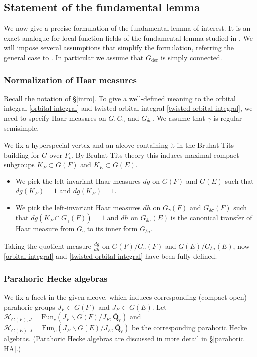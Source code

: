 \documentclass[reqno]{amsart}
\numberwithin{equation}{section}
\newcommand{\Q}{\mathbf{Q}}
\newcommand{\ol}[1]{\overline{#1}}
\newcommand{\Cal}[1]{\mathcal{#1}}
\newcommand{\mrm}[1]{\mathrm{#1}}
\theoremstyle{remark}
\numberwithin{equation}{section}
\begin{document}
\subsection{Statement of the fundamental lemma}\label{FL statement}

We now give a precise formulation of the fundamental lemma of interest. It is an exact analogue for local function fields of the fundamental lemma studied in \cite{Haines09}. We will impose several assumptions that simplify the formulation, referring the general case to \cite{Haines09}. In particular we assume that $G_{\mrm{der}}$ is simply connected.

\subsubsection{Normalization of Haar measures}\label{sssec: Haar measures}
 Recall the notation of \S \ref{intro}. To give a well-defined meaning to the orbital integral \eqref{orbital integral} and twisted orbital integral \eqref{twisted orbital integral}, we need to specify Haar measures on  $G, G_{\gamma}$ and $G_{\delta \sigma}$. We assume that $\gamma$ is regular semisimple. 



We fix a hyperspecial vertex and an alcove containing it in the Bruhat-Tits building for $G$ over $F_t$. By Bruhat-Tits theory this induces maximal compact subgroups $K_F \subset  G(F)$ and $K_E \subset G(E)$. 

\begin{itemize}
\item We pick the left-invariant Haar measures $dg$ on $G(F)$ and $G(E)$ such that $dg(K_F)  =1$ and $dg(K_E)  =1$. 
\item We pick the left-invariant Haar measures $dh$ on $G_{\gamma}(F)$ and $G_{\delta \sigma}(F)$ such that $dg(K_F \cap G_{\gamma}(F) ) = 1$ and $dh$ on $G_{\delta \sigma}(E) $ is the canonical transfer of Haar measure from $G_{\gamma}$ to its inner form $G_{\delta \sigma}$.
\end{itemize}


Taking the quotient measure $\frac{dg}{dh}$ on $G(F)/G_{\gamma}(F)$ and $G(E)/G_{\delta \sigma}(E)$, now \eqref{orbital integral} and \eqref{twisted orbital integral} have been fully defined. \\

	
\subsubsection{Parahoric Hecke algebras} We fix a facet in the given alcove, which induces corresponding (compact open) parahoric groups $J_F \subset G(F)$ and $J_E \subset G(E)$. Let $\Cal{H}_{G(F), J} = \mrm{Fun}_c(J_F \backslash G(F) / J_F, \ol{\Q}_{\ell})$ and $\Cal{H}_{G(E), J} = \mrm{Fun}_c(J_E \backslash G(E) / J_E,  \ol{\Q}_{\ell})$ be the corresponding parahoric Hecke algebras. (Parahoric Hecke algebras are discussed in more detail in \S \ref{parahoric HA}.)
\end{document}
